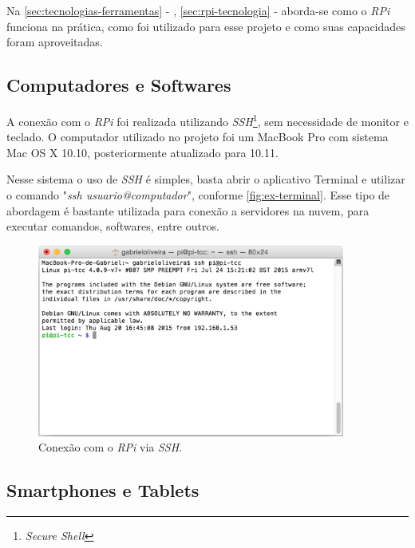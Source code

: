 Na \autoref{sec:tecnologias-ferramentas} - , \autoref{sec:rpi-tecnologia} -  aborda-se como o \textit{RPi} funciona na prática, como foi utilizado para esse projeto e como suas capacidades foram aproveitadas.

\subsection{Computadores e Softwares}\label{sec:comp-softwares}

A conexão com o \textit{RPi} foi realizada utilizando \textit{SSH}\footnote{\textit{Secure Shell}}, sem necessidade de monitor e teclado. O computador utilizado no projeto foi um MacBook Pro com sistema Mac OS X 10.10, posteriormente atualizado para 10.11. 

Nesse sistema o uso de \textit{SSH} é simples, basta abrir o aplicativo Terminal e utilizar o comando "\textit{ssh usuario@computador}", conforme \autoref{fig:ex-terminal}. Esse tipo de abordagem é bastante utilizada para conexão a servidores na nuvem, para executar comandos, softwares, entre outros.

\begin{figure}[htb]
	\caption{\label{fig:ex-terminal}Conexão com o \textit{RPi} via \textit{SSH}.}
	\begin{center}
		\includegraphics[width=0.9\textwidth]{img/terminal-pi.png}
	\end{center}
\end{figure}

\subsection{Smartphones e Tablets}\label{sec:smartphone-tablets}

